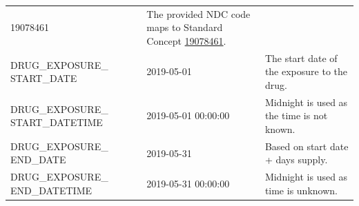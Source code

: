 \documentclass[11pt]{book}
\theoremstyle{definition}
\theoremstyle{definition}
\theoremstyle{definition}
\theoremstyle{remark}
\begin{document}
\begin{longtable}[]{@{}lll@{}}
\begin{minipage}[t]{0.16\columnwidth}
19078461\strut
\end{minipage} & \begin{minipage}[t]{0.48\columnwidth}\raggedright\strut
The provided NDC code maps to Standard Concept
\href{http://athena.ohdsi.org/search-terms/terms/19078461}{19078461}.\strut
\end{minipage}\tabularnewline
\begin{minipage}[t]{0.28\columnwidth}\raggedright\strut
DRUG\_EXPOSURE\_ START\_DATE\strut
\end{minipage} & \begin{minipage}[t]{0.16\columnwidth}\raggedright\strut
2019-05-01\strut
\end{minipage} & \begin{minipage}[t]{0.48\columnwidth}\raggedright\strut
The start date of the exposure to the drug.\strut
\end{minipage}\tabularnewline
\begin{minipage}[t]{0.28\columnwidth}\raggedright\strut
DRUG\_EXPOSURE\_ START\_DATETIME\strut
\end{minipage} & \begin{minipage}[t]{0.16\columnwidth}\raggedright\strut
2019-05-01 00:00:00\strut
\end{minipage} & \begin{minipage}[t]{0.48\columnwidth}\raggedright\strut
Midnight is used as the time is not known.\strut
\end{minipage}\tabularnewline
\begin{minipage}[t]{0.28\columnwidth}\raggedright\strut
DRUG\_EXPOSURE\_ END\_DATE\strut
\end{minipage} & \begin{minipage}[t]{0.16\columnwidth}\raggedright\strut
2019-05-31\strut
\end{minipage} & \begin{minipage}[t]{0.48\columnwidth}\raggedright\strut
Based on start date + days supply.\strut
\end{minipage}\tabularnewline
\begin{minipage}[t]{0.28\columnwidth}\raggedright\strut
DRUG\_EXPOSURE\_ END\_DATETIME\strut
\end{minipage} & \begin{minipage}[t]{0.16\columnwidth}\raggedright\strut
2019-05-31 00:00:00\strut
\end{minipage} & \begin{minipage}[t]{0.48\columnwidth}\raggedright\strut
Midnight is used as time is unknown.\strut
\end{minipage}\tabularnewline

\end{longtable}
\end{document}
